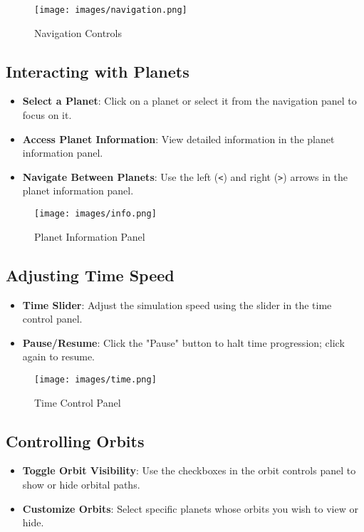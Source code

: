 \documentclass[12pt, a4paper]{article}
\begin{document}
\begin{figure}[H]
    \centering
    \texttt{[image: images/navigation.png]}
    \caption{Navigation Controls}
\end{figure}

\subsection{Interacting with Planets}

\begin{itemize}
    \item \textbf{Select a Planet}: Click on a planet or select it from the navigation panel to focus on it.
    \item \textbf{Access Planet Information}: View detailed information in the planet information panel.
    \item \textbf{Navigate Between Planets}: Use the left (\texttt{<}) and right (\texttt{>}) arrows in the planet information panel.
\end{itemize}

\begin{figure}[H]
    \centering
    \texttt{[image: images/info.png]}
    \caption{Planet Information Panel}
\end{figure}

\subsection{Adjusting Time Speed}

\begin{itemize}
    \item \textbf{Time Slider}: Adjust the simulation speed using the slider in the time control panel.
    \item \textbf{Pause/Resume}: Click the "Pause" button to halt time progression; click again to resume.
\end{itemize}

\begin{figure}[H]
    \centering
    \texttt{[image: images/time.png]}
    \caption{Time Control Panel}
\end{figure}

\subsection{Controlling Orbits}

\begin{itemize}
    \item \textbf{Toggle Orbit Visibility}: Use the checkboxes in the orbit controls panel to show or hide orbital paths.
    \item \textbf{Customize Orbits}: Select specific planets whose orbits you wish to view or hide.
\end{itemize}
\end{document}
